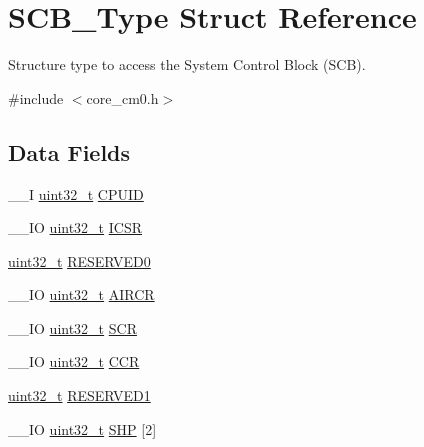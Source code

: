 \hypertarget{struct_s_c_b___type}{\section{S\-C\-B\-\_\-\-Type Struct Reference}
\label{struct_s_c_b___type}
}


Structure type to access the System Control Block (S\-C\-B).  




{\ttfamily \#include $<$core\-\_\-cm0.\-h$>$}

\subsection*{Data Fields}
\begin{DoxyCompactItemize}
\item 
\-\_\-\-\_\-\-I \hyperlink{stdint_8h_a435d1572bf3f880d55459d9805097f62}{uint32\-\_\-t} \hyperlink{struct_s_c_b___type_afa7a9ee34dfa1da0b60b4525da285032}{C\-P\-U\-I\-D}
\item 
\-\_\-\-\_\-\-I\-O \hyperlink{stdint_8h_a435d1572bf3f880d55459d9805097f62}{uint32\-\_\-t} \hyperlink{struct_s_c_b___type_a3e66570ab689d28aebefa7e84e85dc4a}{I\-C\-S\-R}
\item 
\hyperlink{stdint_8h_a435d1572bf3f880d55459d9805097f62}{uint32\-\_\-t} \hyperlink{struct_s_c_b___type_a10960cdc703f661c83a237d9c69db23c}{R\-E\-S\-E\-R\-V\-E\-D0}
\item 
\-\_\-\-\_\-\-I\-O \hyperlink{stdint_8h_a435d1572bf3f880d55459d9805097f62}{uint32\-\_\-t} \hyperlink{struct_s_c_b___type_a6ed3c9064013343ea9fd0a73a734f29d}{A\-I\-R\-C\-R}
\item 
\-\_\-\-\_\-\-I\-O \hyperlink{stdint_8h_a435d1572bf3f880d55459d9805097f62}{uint32\-\_\-t} \hyperlink{struct_s_c_b___type_abfad14e7b4534d73d329819625d77a16}{S\-C\-R}
\item 
\-\_\-\-\_\-\-I\-O \hyperlink{stdint_8h_a435d1572bf3f880d55459d9805097f62}{uint32\-\_\-t} \hyperlink{struct_s_c_b___type_a6d273c6b90bad15c91dfbbad0f6e92d8}{C\-C\-R}
\item 
\hyperlink{stdint_8h_a435d1572bf3f880d55459d9805097f62}{uint32\-\_\-t} \hyperlink{struct_s_c_b___type_adddd65958c1c4c0301f62ede0a9bf12e}{R\-E\-S\-E\-R\-V\-E\-D1}
\item 
\-\_\-\-\_\-\-I\-O \hyperlink{stdint_8h_a435d1572bf3f880d55459d9805097f62}{uint32\-\_\-t} \hyperlink{struct_s_c_b___type_a16d5a38234fb96ac6a5c4b2a9e78c1be}{S\-H\-P} \mbox{[}2\mbox{]}
\item 

\end{DoxyCompactItemize}
